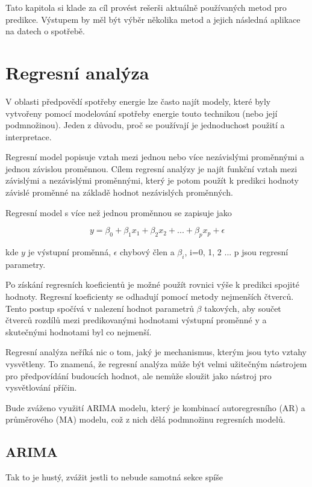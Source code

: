\documentclass[FM,BP,fonts]{tulthesis}
\begin{document}
Tato kapitola si klade za cíl provést rešerši aktuálně používaných metod pro predikce. Výstupem by měl být výběr několika metod a jejich následná aplikace na datech o spotřebě.

\section{Regresní analýza}
V oblasti předpovědí spotřeby energie lze často najít modely, které byly vytvořeny pomocí modelování spotřeby energie touto technikou (nebo její podmnožinou). Jeden z důvodu, proč se používají je jednoduchost použití a interpretace.

Regresní model popisuje vztah mezi jednou nebo více nezávislými proměnnými a jednou závislou proměnnou. Cílem regresní analýzy je najít funkční vztah mezi závislými a nezávislými proměnnými, který je potom použít k predikci hodnoty závislé proměnné na základě hodnot nezávislých proměnných.

Regresní model s více než jednou proměnnou se zapisuje jako

\begin{equation}
	y = \beta_0 + \beta_1x_1 + \beta_2x_2 + ... + \beta_px_p +  \epsilon
\end{equation}

kde $y$ je výstupní proměnná, $\epsilon$ chybový člen a $\beta_i$, i=0, 1, 2 ... p jsou regresní parametry.

Po získání regresních koeficientů je možné použít rovnici výše k predikci spojité hodnoty. Regresní koeficienty se odhadují pomocí metody nejmenších čtverců. Tento postup spočívá v nalezení hodnot parametrů $\beta$ takových, aby součet čtverců rozdílů mezi predikovanými hodnotami výstupní proměnné y a skutečnými hodnotami byl co nejmenší.  \cite{hanousek1992moderni}

Regresní analýza neříká nic o tom, jaký je mechanismus, kterým jsou tyto vztahy vysvětleny. To znamená, že regresní analýza může být velmi užitečným nástrojem pro předpovídání budoucích hodnot, ale nemůže sloužit jako nástroj pro vysvětlování příčin.

Bude zváženo využití ARIMA modelu, který je kombinací autoregresního (AR) a průměrového (MA) modelu, což z nich dělá podmnožinu regresních modelů.


\subsection{ARIMA}
Tak to je hustý, zvážit jestli to nebude samotná sekce spíše
\end{document}
